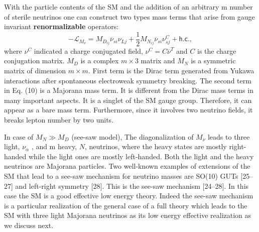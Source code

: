 

\iffalse
With the particle contents of the SM and the addition of an arbitrary m number of sterile neutrinos one can construct two types mass terms that arise from gauge invariant \textbf{renormalizable} operators:
\begin{equation}
-\mathcal{L}_{M_\nu} = M_{D_{ij}}\overline{\nu}_{si}\nu_{Lj}+	
\frac{1}{2}M_{N_{ij}}\overline{\nu}_{si}\nu_{sj}^C+\textsf{h.c.},
\end{equation}
where $\nu^C$ indicated a charge conjugated field, $\nu^C=C\overline{\nu}^T$ and $C$ is the charge conjugation matrix. $M_D$ is a complex $m\times 3$ matrix and $M_N$ is a symmetric matrix of dimension $m\times m$. First term is the Dirac term generated from Yukawa interactions after spontaneous electroweak symmetry breaking. The second term in Eq. (10) is a Majorana mass term. It is different from the Dirac mass terms in many important aspects. It is a singlet of the SM gauge group. Therefore, it can appear as a bare mass term. Furthermore, since it involves two neutrino fields, it breaks lepton number by two units.

\cite{Gonzalez-GarciaPhenomenologyMassiveNu.pdf} In case of $M_N\gg M_D$ (see-saw model), The diagonalization of $M_\nu$ leads to three light, $\nu_\alpha$ , and m heavy, $N$, neutrinos, where the heavy states are mostly right-handed while the light ones are mostly left-handed. Both the light and the heavy neutrinos are Majorana particles. Two well-known examples of extensions of the SM that lead to a see-saw mechanism for neutrino masses are SO(10) GUTs [25–27] and left-right symmetry [28]. This is the see-saw mechanism [24–28]. In this case the SM is a good effective low energy theory. Indeed the see-saw mechanism is a particular realization of the general case of a full theory which leads to the SM with three light Majorana neutrinos as its low energy effective realization as we discuss next.

